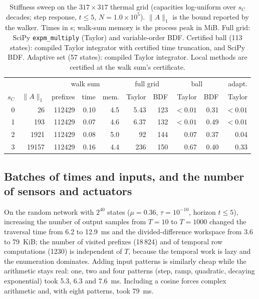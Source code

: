 \documentclass[aps,pra,superscriptaddress,floatfix,longbibliography,twocolumn]{revtex4-2}
\begin{document}
\begin{table}[t]
\footnotesize\setlength{\tabcolsep}{1.8pt}
\caption{Stiffness sweep on the $317\times317$ thermal grid (capacities log-uniform over $s_C$ decades; step response, $t\le5$, $N=1.0\times10^5$). $\|A\|_1$ is the bound reported by the walker. Times in s; walk-sum memory is the process peak in MiB. Full grid: SciPy \texttt{expm\_multiply} (Taylor) and variable-order BDF. Certified ball (113 states): compiled Taylor integrator with certified time truncation, and SciPy BDF. Adaptive set (57 states): compiled Taylor integrator. Local methods are certified at the walk sum's certificate.}\label{tab:stiff}
\begin{ruledtabular}
\begin{tabular}{rr|rrr|rr|rr|r}
 & & \multicolumn{3}{c|}{walk sum} & \multicolumn{2}{c|}{full grid} & \multicolumn{2}{c|}{ball} & adapt.\\
$s_C$ & $\|A\|_1$ & prefixes & time & mem. & Taylor & BDF & Taylor & BDF & Taylor\\\hline
0 & 26 & 112429 & 0.10 & 4.5 & 5.43 & 123 & $<0.01$ & 0.31 & $<0.01$ \\
1 & 193 & 112429 & 0.07 & 4.6 & 6.37 & 132 & $<0.01$ & 0.49 & $<0.01$ \\
2 & 1921 & 112429 & 0.08 & 5.0 & 92 & 144 & 0.07 & 0.37 & 0.04 \\
3 & 19157 & 112429 & 0.16 & 4.4 & 236 & 150 & 0.67 & 0.40 & 0.33 \\
\end{tabular}
\end{ruledtabular}
\end{table}

\subsection{Batches of times and inputs, and the number of sensors and actuators}\label{sec:batch}
On the random network with $2^{40}$ states ($\mu=0.36$, $\tau=10^{-10}$, horizon $t\le5$), increasing the number of output samples from $T=10$ to $T=1000$ changed the traversal time from 6.2 to 12.9~ms and the divided-difference workspace from 3.6 to 79~KiB; the number of visited prefixes (18\,824) and of temporal row computations (1230) is independent of $T$, because the temporal work is lazy and the enumeration dominates. Adding input patterns is similarly cheap while the arithmetic stays real: one, two and four patterns (step, ramp, quadratic, decaying exponential) took 5.3, 6.3 and 7.6~ms. Including a cosine forces complex arithmetic and, with eight patterns, took 79~ms.
\end{document}
